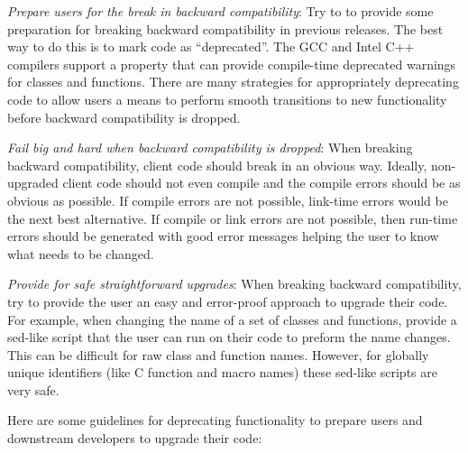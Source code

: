 \documentclass[11pt]{SANDreport}
\begin{document}
\begin{compactitem}

{}\item\textit{Prepare users for the break in backward compatibility}:
Try to to provide some preparation for breaking backward compatibility
in previous releases.  The best way to do this is to mark code as
``deprecated''.  The GCC and Intel C++ compilers support a
{} property that can provide compile-time
deprecated warnings for classes and functions.  There are many
strategies for appropriately deprecating code to allow users a means
to perform smooth transitions to new functionality before backward
compatibility is dropped.

{}\item\textit{Fail big and hard when backward compatibility is
dropped}: When breaking backward compatibility, client code should
break in an obvious way.  Ideally, non-upgraded client code should not
even compile and the compile errors should be as obvious as possible.
If compile errors are not possible, link-time errors would be the next
best alternative.  If compile or link errors are not possible, then
run-time errors should be generated with good error messages helping
the user to know what needs to be changed.

{}\item\textit{Provide for safe straightforward upgrades}: When
breaking backward compatibility, try to provide the user an easy and
error-proof approach to upgrade their code.  For example, when
changing the name of a set of classes and functions, provide a
sed-like script that the user can run on their code to preform the
name changes.  This can be difficult for raw class and function names.
However, for globally unique identifiers (like C function and macro
names) these sed-like scripts are very safe.

\end{compactitem}

Here are some guidelines for deprecating functionality to prepare
users and downstream developers to upgrade their code:
\end{document}
